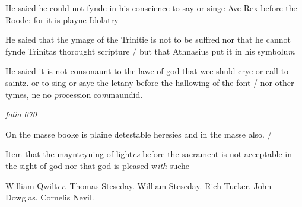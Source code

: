 \documentclass[12pt, a4paper]{book}
\begin{document}
				\marginpar[\vspace{0.5cm}{\textcolor{Gray}{sclanderous}}]{}
			 
		\ifthenelse{\isodd{\thepage}}
		{\reversemarginpar}
		{\normalmarginpar}
		He saied he could not fynde in his conscience to
 say or singe Ave Rex before the Roode: for it
 is playne Idolatry
 
			 
		\ifthenelse{\isodd{\thepage}}
		{\reversemarginpar}
		{\normalmarginpar}
		He saied that the ymage of the Trinitie is not
 to be suffred nor that he cannot fynde Trinitas
 thorought scripture / but that Athnasius put
 it in his symbolu\textit{m}
 
			
 	
		\ifthenelse{\isodd{\thepage}}
		{\reversemarginpar}
		{\normalmarginpar}
		He saied it is not consonaunt to the lawe of god
 that wee shuld crye or call to saintz. or to sing
 or saye the letany before the hallowing of the
 font / nor other tymes, ne no \textit{pro}cession co\textit{m}maundid.



\dotfill
					

\textit{folio 070}


	
		
				\marginpar[\vspace{0.5cm}{\textcolor{Gray}{offensive}}]{}
			
		
		\ifthenelse{\isodd{\thepage}}
		{\reversemarginpar}
		{\normalmarginpar}
		On the masse booke is plaine detestable heresies
	 and in the masse also. /
	
	 
	 	
			
	 	
		\ifthenelse{\isodd{\thepage}}
		{\reversemarginpar}
		{\normalmarginpar}
		Item that the maynteyning of light\textit{es} before the
	 sacrament is not acceptable in the sight of god
	 nor that god is pleased w\textit{ith} suche
	 	
		\ifthenelse{\isodd{\thepage}}
		{\reversemarginpar}
		{\normalmarginpar}
		William Qwilt\textit{er}. Thomas Steseday. William Steseday.
	 		Rich Tucker. John Dowglas. Cornelis Nevil.
			
\end{document}
